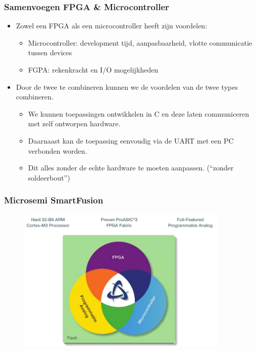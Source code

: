 \documentclass{beamer}
\begin{document}
\begin{frame} 
\frametitle{Samenvoegen FPGA \& Microcontroller}
 \begin{itemize}[<+->]
   \item Zowel een FPGA als een microcontroller heeft zijn voordelen:
    \begin{itemize}
      \item Microcontroller: development tijd, aanpasbaarheid, vlotte communicatie tussen devices 
      \item FGPA: rekenkracht en I/O mogelijkheden
      \end{itemize}
    \item Door de twee te combineren kunnen we de voordelen van de twee types combineren.
      \begin{itemize}
       \item We kunnen toepassingen ontwikkelen in C en deze laten communiceren met zelf ontworpen hardware.
       \item Daarnaast kan de toepassing eenvoudig via de UART met een PC verbonden worden.
       \item Dit alles zonder de echte hardware te moeten aanpassen. (``zonder soldeerbout'')
      \end{itemize}
   \end{itemize} 
\end{frame}



\begin{frame} 
\frametitle{Microsemi SmartFusion}
  \begin{figure}[h]
  \includegraphics[width=0.9\textwidth]{images/fusiondiagram.jpeg}
  \end{figure}
\end{frame}
\end{document}
